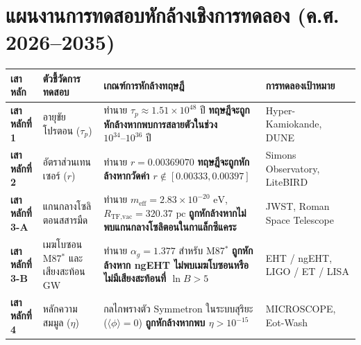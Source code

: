 \documentclass[11pt, a4paper]{article}
\begin{document}
\section{แผนงานการทดสอบหักล้างเชิงการทดลอง (ค.ศ. 2026--2035)}

\begin{center}
{\small
\setlength{\tabcolsep}{4.5pt}
\begin{tabular}{p{2.2cm} p{3.5cm} p{6.1cm} p{3.2cm}}
\toprule
\textbf{เสาหลัก} & \textbf{ตัวชี้วัดการทดสอบ} & \textbf{เกณฑ์การหักล้างทฤษฎี} & \textbf{การทดลองเป้าหมาย} \\
\midrule
\textbf{เสาหลักที่ 1} & อายุขัยโปรตอน ($\tau_p$) & ทำนาย $\tau_p \approx 1.51 \times 10^{48}\text{ ปี}$ \textbf{ทฤษฎีจะถูกหักล้างหากพบการสลายตัวในช่วง $10^{34}\text{--}10^{36}\text{ ปี}$} & Hyper-Kamiokande, DUNE \\
\rowcolor{rowtint}
\textbf{เสาหลักที่ 2} & อัตราส่วนเทนเซอร์ ($r$) & ทำนาย $r = 0.00369070$ \textbf{ทฤษฎีจะถูกหักล้างหากวัดค่า $r \notin [0.00333, 0.00397]$} & Simons Observatory, LiteBIRD \\
\textbf{เสาหลักที่ 3-A} & แกนกลางโซลิตอนสสารมืด & ทำนาย $m_{\text{eff}} = 2.83 \times 10^{-20}\text{ eV}$, $R_{\text{TF,vac}} = 320.37\text{ pc}$ \textbf{ถูกหักล้างหากไม่พบแกนกลางโซลิตอนในกาแล็กซีแคระ} & JWST, Roman Space Telescope \\
\rowcolor{rowtint}
\textbf{เสาหลักที่ 3-B} & เมฆโบซอน M87$^*$ และเสียงสะท้อน GW & ทำนาย $\alpha_g = 1.377$ สำหรับ M87$^*$ \textbf{ถูกหักล้างหาก ngEHT ไม่พบเมฆโบซอนหรือไม่มีเสียงสะท้อนที่ $\ln B > 5$} & EHT / ngEHT, LIGO / ET / LISA \\
\textbf{เสาหลักที่ 4} & หลักความสมมูล ($\eta$) & กลไกพรางตัว Symmetron ในระบบสุริยะ ($\langle\phi\rangle = 0$) \textbf{ถูกหักล้างหากพบ $\eta > 10^{-15}$} & MICROSCOPE, Eot-Wash \\
\bottomrule
\end{tabular}
}
\end{center}
\end{document}
